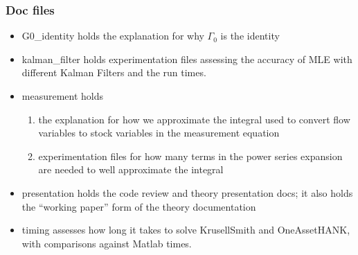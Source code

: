 \documentclass{beamer}
\begin{document}
\begin{frame}
  \frametitle{Doc files}
\begin{itemize}
\item G0\_identity holds the explanation for why $\Gamma_0$ is the identity
\item kalman\_filter holds experimentation files assessing the accuracy of MLE with different Kalman Filters and the run times.
\item measurement holds
  \begin{enumerate}
  \item  the explanation for how we approximate the integral used to convert flow variables to stock variables in the measurement equation
  \item experimentation files for how many terms in the power series expansion are needed to well approximate the integral
  \end{enumerate}
\item presentation holds the code review and theory presentation docs; it also holds the ``working paper'' form of the theory documentation
\item  timing assesses how long it takes to solve KrusellSmith and OneAssetHANK, with comparisons against Matlab times.
\end{itemize}
\end{frame}
\end{document}
